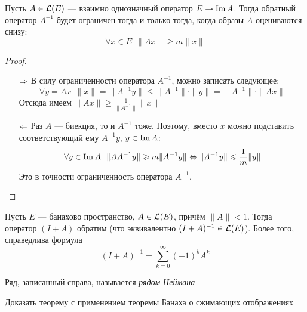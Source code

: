 \begin{theorem} \label{reverse_op_crit}
	Пусть $A \in \mathcal{L}(E)$ --- взаимно однозначный оператор $E \to \operatorname{Im} A$. Тогда обратный оператор $A^{-1}$ будет ограничен тогда и только тогда, когда образы $A$ оцениваются снизу:
	\[
		\forall x \in E\ \ \|Ax\| \ge m\|x\|
	\]
\end{theorem}

\begin{proof}~
	\begin{itemize}
		\item[$\Rightarrow$] В силу ограниченности оператора $A^{-1}$, можно записать следующее:
		\[
			\forall y = Ax\ \ \|x\| = \|A^{-1}y\| \le \|A^{-1}\| \cdot \|y\| = \|A^{-1}\| \cdot \|Ax\|
		\]
		Отсюда имеем $\|Ax\| \ge \frac{1}{\|A^{-1}\|}\|x\|$
		
		\item[$\Leftarrow$] Раз $A$ --- биекция, то и $A^{-1}$ тоже. Поэтому, вместо $x$ можно подставить соответствующий ему $A^{-1}y$, $y \in \operatorname{Im} A$:
		\[
			\forall y \in \operatorname{Im} A\ \ \|AA^{-1}y\| \geqslant m\|A^{-1}y\| \Leftrightarrow \|A^{-1}y\| \leqslant \frac{1}{m}\|y\|
		\]
		Это в точности ограниченность оператора $A^{-1}$.
	\end{itemize}
\end{proof}

\begin{theorem} \label{simple_inverse_op_theorem}
	Пусть $E$ --- банахово пространство, $A \in \mathcal{L}(E)$, причём $\|A\| < 1$. Тогда оператор $(I + A)$ обратим (что эквивалентно $(I + A)^{-1} \in \mathcal{L}(E)$). Более того, справедлива формула
	\[
		(I + A)^{-1} = \sum_{k = 0}^\infty (-1)^kA^k
	\]
\end{theorem}

\begin{note}
	Ряд, записанный справа, называется \textit{рядом Неймана}
\end{note}

\begin{exercise}
	Доказать теорему с применением теоремы Банаха о сжимающих отображениях
\end{exercise}

